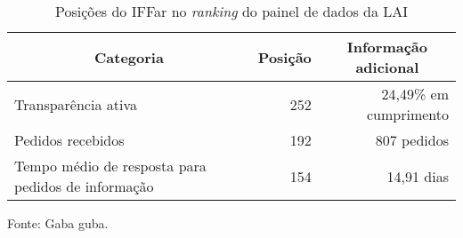 \begin{table}[H]
  \Centering\singlespacing

  \caption{Posições do IFFar no \textit{ranking} do painel de dados da LAI}
  \label{tabela:cgu-iffar}
  \begin{tabularx}{15cm} %
    {X r r} %
    \hline
    \multicolumn{1}{c}{\textbf{Categoria}}    &   
    \multicolumn{1}{c}{\textbf{Posição}}  & 
    \multicolumn{1}{c}{\textbf{Informação adicional}} \\
    \hline

    Transparência ativa &
    252\textordmasculine{} &
    24,49\% em cumprimento \\

    Pedidos recebidos &
    192\textordmasculine{} &
    807 pedidos \\

    Tempo médio de resposta para pedidos de informação       &   
    154\textordmasculine{} &
    14,91 dias \\
    \hline

  \end{tabularx}

\hspace{\fill}

\footnotesize

Fonte: Gaba guba.
\end{table}

